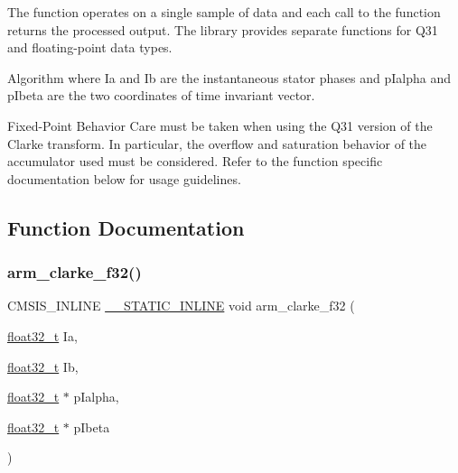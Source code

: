 The function operates on a single sample of data and each call to the function returns the processed output. The library provides separate functions for Q31 and floating-\/point data types. \begin{DoxyParagraph}{Algorithm}
 where {\ttfamily Ia} and {\ttfamily Ib} are the instantaneous stator phases and {\ttfamily p\+Ialpha} and {\ttfamily p\+Ibeta} are the two coordinates of time invariant vector. 
\end{DoxyParagraph}
\begin{DoxyParagraph}{Fixed-\/\+Point Behavior}
Care must be taken when using the Q31 version of the Clarke transform. In particular, the overflow and saturation behavior of the accumulator used must be considered. Refer to the function specific documentation below for usage guidelines. 
\end{DoxyParagraph}


\subsection{Function Documentation}
\mbox{\label{group__clarke_gabbfa27c68837d22f03d6c6259569caa8}} 
\subsubsection{\texorpdfstring{arm\+\_\+clarke\+\_\+f32()}{arm\_clarke\_f32()}}
{\footnotesize\ttfamily C\+M\+S\+I\+S\+\_\+\+I\+N\+L\+I\+NE \mbox{\hyperlink{cmsis__iccarm_8h_aba87361bfad2ae52cfe2f40c1a1dbf9c}{\+\_\+\+\_\+\+S\+T\+A\+T\+I\+C\+\_\+\+I\+N\+L\+I\+NE}} void arm\+\_\+clarke\+\_\+f32 (\begin{DoxyParamCaption}\item[{\mbox{\hyperlink{arm__math_8h_a4611b605e45ab401f02cab15c5e38715}{float32\+\_\+t}}}]{Ia,  }\item[{\mbox{\hyperlink{arm__math_8h_a4611b605e45ab401f02cab15c5e38715}{float32\+\_\+t}}}]{Ib,  }\item[{\mbox{\hyperlink{arm__math_8h_a4611b605e45ab401f02cab15c5e38715}{float32\+\_\+t}} $\ast$}]{p\+Ialpha,  }\item[{\mbox{\hyperlink{arm__math_8h_a4611b605e45ab401f02cab15c5e38715}{float32\+\_\+t}} $\ast$}]{p\+Ibeta }\end{DoxyParamCaption})}



